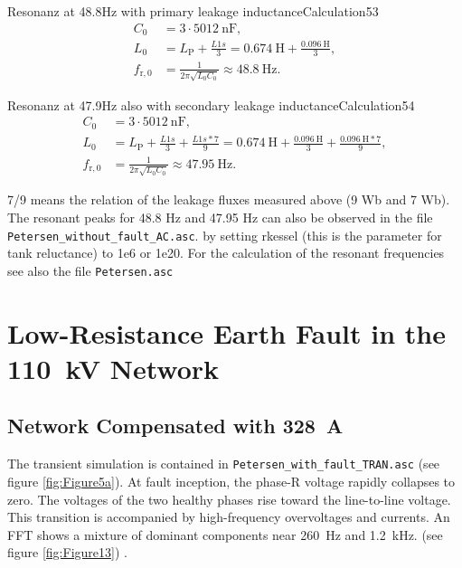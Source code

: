 \begin{calculation}{Resonanz at 48.8Hz with primary leakage inductance}{Calculation53}
	\begin{align}
		C_0&=3\cdot\SI{5012}{\nano\farad},\\
		L_0&=L_{\mathrm P}+\frac{L1s}{3}
		=\SI{0.674}{\henry}+\frac{\SI{0.096}{\henry}}{3},\\
		f_{\mathrm r,0}&=\frac{1}{2\pi\sqrt{L_0C_0}}
		\approx\boxed{\SI{48.8}{\hertz}}.
	\end{align}
\end{calculation}

\begin{calculation}{Resonanz at 47.9Hz also with secondary leakage inductance}{Calculation54}
	\begin{align}
		C_0&=3\cdot\SI{5012}{\nano\farad},\\
		L_0&=L_{\mathrm P}+\frac{L1s}{3}+\frac{L1s*7}{9}
		=\SI{0.674}{\henry}+\frac{\SI{0.096}{\henry}}{3}+\frac{\SI{0.096}{\henry}*7}{9},\\
		f_{\mathrm r,0}&=\frac{1}{2\pi\sqrt{L_0C_0}}
		\approx\boxed{\SI{47.95}{\hertz}}.
	\end{align}
\end{calculation}

7/9 means the relation of the leakage fluxes measured above (9 Wb and 7 Wb).  
The resonant peaks for 48.8 Hz and 47.95 Hz can also be observed in the file\\
\texttt{Petersen\_without\_fault\_AC.asc}. 
by setting rkessel (this is the parameter for tank reluctance) to 1e6 or 1e20.
For the calculation of the resonant frequencies see also the file \texttt{Petersen.asc}



\section{Low-Resistance Earth Fault in the \SI{110}{\kilo\volt} Network}
\label{sec:110kv-low-resistance-earth-fault}

\subsection{Network Compensated with \SI{328}{\ampere} }
\label{sec:300a-earth-fault}

The transient simulation is contained in
\texttt{Petersen\_with\_fault\_TRAN.asc} (see figure \ref{fig:Figure5a}). At fault inception, the phase-R voltage
rapidly collapses to zero. The voltages of the two healthy phases rise toward
the line-to-line voltage. This transition is accompanied by high-frequency
overvoltages and currents. An FFT shows a mixture of dominant components near
\SI{260}{\hertz} and \SI{1.2}{\kilo\hertz}. (see figure \ref{fig:Figure13}) .

